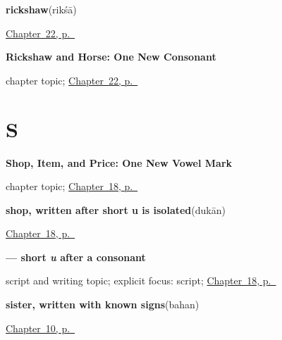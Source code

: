 \noindent\begin{minipage}[t]{\linewidth}
\raggedright
\textbf{rickshaw}\enspace\emph{}\enspace(rikśā)\par
\footnotesize \hyperref[ch:mw-transport-five]{Chapter~22, p.~\pageref*{ch:mw-transport-five}}
\end{minipage}\par\smallskip

\noindent\begin{minipage}[t]{\linewidth}
\raggedright
\textbf{Rickshaw and Horse: One New Consonant}\par
\footnotesize chapter topic; \hyperref[ch:mw-transport-five]{Chapter~22, p.~\pageref*{ch:mw-transport-five}}
\end{minipage}\par\smallskip

\section*{S}

\noindent\begin{minipage}[t]{\linewidth}
\raggedright
\textbf{Shop, Item, and Price: One New Vowel Mark}\par
\footnotesize chapter topic; \hyperref[ch:mw-shopping-three]{Chapter~18, p.~\pageref*{ch:mw-shopping-three}}
\end{minipage}\par\smallskip

\noindent\begin{minipage}[t]{\linewidth}
\raggedright
\textbf{shop, written after short u is isolated}\enspace\emph{}\enspace(dukān)\par
\footnotesize \hyperref[ch:mw-shopping-three]{Chapter~18, p.~\pageref*{ch:mw-shopping-three}}
\end{minipage}\par\smallskip

\noindent\begin{minipage}[t]{\linewidth}
\raggedright
\textbf{ — short \emph{u} after a consonant}\par
\footnotesize script and writing topic; explicit focus: script; \hyperref[ch:mw-shopping-three]{Chapter~18, p.~\pageref*{ch:mw-shopping-three}}
\end{minipage}\par\smallskip

\noindent\begin{minipage}[t]{\linewidth}
\raggedright
\textbf{sister, written with known signs}\enspace\emph{}\enspace(bahan)\par
\footnotesize \hyperref[ch:mw-family-four]{Chapter~10, p.~\pageref*{ch:mw-family-four}}
\end{minipage}\par\smallskip

